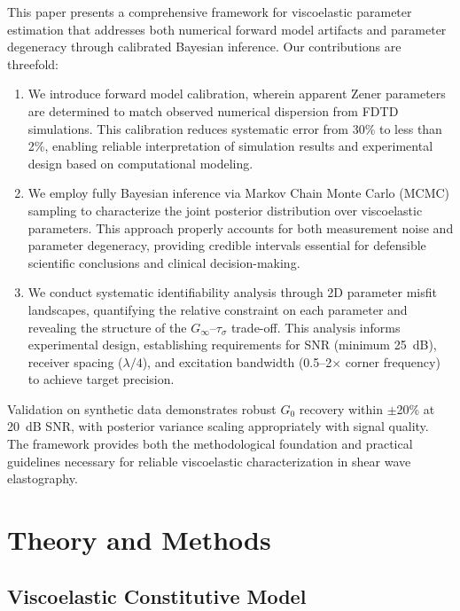\documentclass[journal]{IEEEtran}
\begin{document}
This paper presents a comprehensive framework for viscoelastic parameter estimation that addresses both numerical forward model artifacts and parameter degeneracy through calibrated Bayesian inference. Our contributions are threefold:

\begin{enumerate}
\item We introduce forward model calibration, wherein apparent Zener parameters are determined to match observed numerical dispersion from FDTD simulations. This calibration reduces systematic error from 30\% to less than 2\%, enabling reliable interpretation of simulation results and experimental design based on computational modeling.

\item We employ fully Bayesian inference via Markov Chain Monte Carlo (MCMC) sampling to characterize the joint posterior distribution over viscoelastic parameters. This approach properly accounts for both measurement noise and parameter degeneracy, providing credible intervals essential for defensible scientific conclusions and clinical decision-making.

\item We conduct systematic identifiability analysis through 2D parameter misfit landscapes, quantifying the relative constraint on each parameter and revealing the structure of the $G_\infty$--$\tau_\sigma$ trade-off. This analysis informs experimental design, establishing requirements for SNR (minimum 25~dB), receiver spacing ($\lambda/4$), and excitation bandwidth (0.5--2$\times$ corner frequency) to achieve target precision.
\end{enumerate}

Validation on synthetic data demonstrates robust $G_0$ recovery within $\pm$20\% at 20~dB SNR, with posterior variance scaling appropriately with signal quality. The framework provides both the methodological foundation and practical guidelines necessary for reliable viscoelastic characterization in shear wave elastography.

\section{Theory and Methods}

\subsection{Viscoelastic Constitutive Model}
\end{document}

